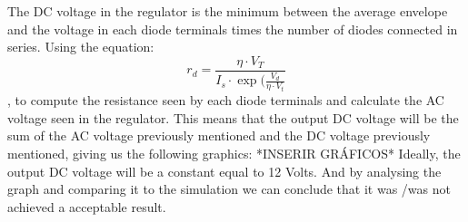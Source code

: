 The DC voltage in the regulator is the minimum between the average envelope and the voltage in each diode terminals times the number of diodes connected in series.
Using the equation:
\begin{equation}
 r_d= \frac {\eta \cdot V_T}{ I_s \cdot \exp(\frac{V_d}{\eta \cdot V_t}}
  \label{eq: rd}
\end{equation}
, to compute the resistance seen by each diode terminals and calculate the AC voltage seen in the regulator.
This means that the output DC voltage will be the sum of the AC voltage previously mentioned and the DC voltage previously mentioned, giving us the following graphics:
*INSERIR GRÁFICOS*
Ideally, the output DC voltage will be a constant equal to 12 Volts. And by analysing the graph and comparing it to the simulation we can conclude that it was /was not achieved a acceptable result.


